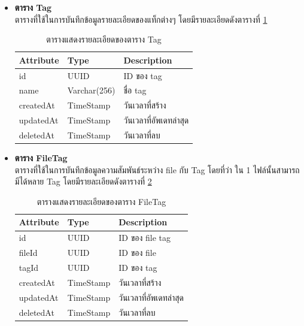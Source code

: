 \documentclass[12pt,oneside,openright,a4paper]{cpe-thai-project}
\begin{document}
\begin{itemize}
\item \textbf{ตาราง Tag}\\
ตารางที่ใช้ในการบันทึกข้อมูลรายละเอียดของแท็กต่างๆ โดยมีรายละเอียดดังตารางที่ \ref{tbl:dbTag}
\begin{table}[!ht]
    \centering
    \begin{tabular}{|p{4cm}|p{2cm}|p{6cm}|}
    \hline
    \textbf{Attribute} & \textbf{Type} & \textbf{Description}   \\ \hline
    id                 & UUID          & ID ของ tag             \\ \hline
    name               & Varchar(256)   & ชื่อ tag               \\ \hline
    createdAt          & TimeStamp     & วันเวลาที่สร้าง        \\ \hline
    updatedAt          & TimeStamp     & วันเวลาที่อัพเดทล่าสุด \\ \hline
    deletedAt          & TimeStamp     & วันเวลาที่ลบ       \\ \hline
    \end{tabular}
    \caption{\centering  ตารางแสดงรายละเอียดของตาราง Tag} \label{tbl:dbTag}
\end{table}
\newpage
\item \textbf{ตาราง FileTag}\\
ตารางที่ใช้ในการบันทึกข้อมูลความสัมพันธ์ระหว่าง file กับ Tag โดยที่ว่า ใน 1 ไฟล์นั้นสามารถมีได้หลาย Tag โดยมีรายละเอียดดังตารางที่ \ref{tbl:dbFileTag}
\begin{table}[!ht]
    \centering
    \begin{tabular}{|p{4cm}|p{2cm}|p{6cm}|}
    \hline
    \textbf{Attribute} & \textbf{Type} & \textbf{Description}   \\ \hline
    id                 & UUID          & ID ของ file tag        \\ \hline
    fileId             & UUID          & ID ของ file            \\ \hline
    tagId              & UUID          & ID ของ tag             \\ \hline
    createdAt          & TimeStamp     & วันเวลาที่สร้าง        \\ \hline
    updatedAt          & TimeStamp     & วันเวลาที่อัพเดทล่าสุด \\ \hline
    deletedAt          & TimeStamp     & วันเวลาที่ลบ          \\ \hline
    \end{tabular}
    \caption{\centering  ตารางแสดงรายละเอียดของตาราง FileTag} \label{tbl:dbFileTag}
\end{table}


\end{itemize}
\end{document}
